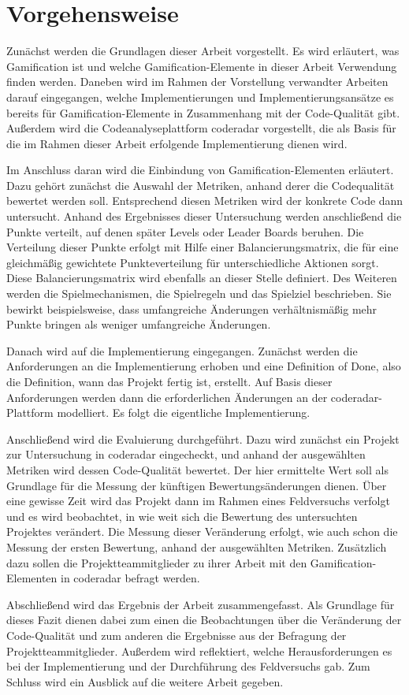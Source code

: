 \documentclass[fontsize=11pt, paper=a4, parskip=half]{scrartcl}
\begin{document}
\section{Vorgehensweise}
Zunächst werden die Grundlagen dieser Arbeit vorgestellt.
Es wird erläutert, was Gamification ist und welche Gamification-Elemente in dieser Arbeit Verwendung finden werden.
Daneben wird im Rahmen der Vorstellung verwandter Arbeiten darauf eingegangen, welche Implementierungen und Implementierungsansätze es bereits für Gamification-Elemente in Zusammenhang mit der Code-Qualität gibt.
Außerdem wird die Codeanalyseplattform coderadar vorgestellt, die als Basis für die im Rahmen dieser Arbeit erfolgende Implementierung dienen wird.

Im Anschluss daran wird die Einbindung von Gamification-Elementen erläutert.
Dazu gehört zunächst die Auswahl der Metriken, anhand derer die Codequalität bewertet werden soll.
Entsprechend diesen Metriken wird der konkrete Code dann untersucht.
Anhand des Ergebnisses dieser Untersuchung werden anschließend die Punkte verteilt, auf denen später Levels oder Leader Boards beruhen.
Die Verteilung dieser Punkte erfolgt mit Hilfe einer Balancierungsmatrix, die für eine gleichmäßig gewichtete Punkteverteilung für unterschiedliche Aktionen sorgt.
Diese Balancierungsmatrix wird ebenfalls an dieser Stelle definiert.
Des Weiteren werden die Spielmechanismen, die Spielregeln und das Spielziel beschrieben.
Sie bewirkt beispielsweise, dass umfangreiche Änderungen verhältnismäßig mehr Punkte bringen als weniger umfangreiche Änderungen.

Danach wird auf die Implementierung eingegangen.
Zunächst werden die Anforderungen an die Implementierung erhoben und eine Definition of Done, also die Definition, wann das Projekt fertig ist, erstellt.
Auf Basis dieser Anforderungen werden dann die erforderlichen Änderungen an der coderadar-Plattform modelliert.
Es folgt die eigentliche Implementierung.

Anschließend wird die Evaluierung durchgeführt.
Dazu wird zunächst ein Projekt zur Untersuchung in coderadar eingecheckt, und anhand der ausgewählten Metriken wird dessen Code-Qualität bewertet.
Der hier ermittelte Wert soll als Grundlage für die Messung der künftigen Bewertungsänderungen dienen.
Über eine gewisse Zeit wird das Projekt dann im Rahmen eines Feldversuchs verfolgt und es wird beobachtet, in wie weit sich die Bewertung des untersuchten Projektes verändert.
Die Messung dieser Veränderung erfolgt, wie auch schon die Messung der ersten Bewertung, anhand der ausgewählten Metriken.
Zusätzlich dazu sollen die Projektteammitglieder zu ihrer Arbeit mit den Gamification-Elementen in coderadar befragt werden.

Abschließend wird das Ergebnis der Arbeit zusammengefasst.
Als Grundlage für dieses Fazit dienen dabei zum einen die Beobachtungen über die Veränderung der Code-Qualität und zum anderen die Ergebnisse aus der Befragung der Projektteammitglieder.
Außerdem wird reflektiert, welche Herausforderungen es bei der Implementierung und der Durchführung des Feldversuchs gab.
Zum Schluss wird ein Ausblick auf die weitere Arbeit gegeben.

\pagebreak



\end{document}
